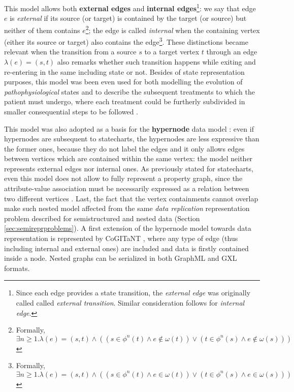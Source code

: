 This model allows both \textbf{external edges} and \textbf{internal edges}\footnote{Since each edge provides a state transition, the \textit{external edge} was originally called called \textit{external transition}. Similar consideration follows for \textit{internal edge}.}: we say that edge $e$ is \textit{external} if its source (or target) is contained by the target (or source) but neither of them contains $e$\footnote{Formally, $\exists n\geq 1.\lambda(e)=(s,t)\wedge ((s\in\phi^n(t) \wedge e\notin \omega(t))\vee (t\in \phi^n(s)\wedge e\notin \omega(s)))$}; the edge is called \textit{internal} when the containing vertex (either its source or target) also contains the edge\footnote{Formally, $\exists n\geq 1.\lambda(e)=(s,t)\wedge ((s\in\phi^n(t) \wedge e\in \omega(t))\vee (t\in \phi^n(s)\wedge e\in \omega(s)))$}. These distinctions became relevant when the transition from a source $s$ to a target vertex $t$ through an edge $\lambda(e)=(s,t)$ also remarks whether such transition happens while exiting and re-entering in the same including state or not. Besides of state representation purposes, this model was been even used for both modelling the evolution of \textit{pathophysiological} states and to describe the subsequent treatments to which the patient must undergo, where each treatment could be furtherly subdivided in smaller consequential steps to be followed \cite{NestedGlaucoma}.

This model was also adopted as a basis for the \textbf{hypernode} data model \cite{Poulovassilis1994}: even if hypernodes are subsequent to statecharts, the hypernodes are less expressive than the former ones, because they do not label the edges and it only allows edges between vertices which are contained within the same vertex: the model neither represents external edges nor internal ones. As previously stated for statecharts, even this model does not allow to fully represent a property graph, since the attribute-value association must be necessarily expressed as a relation between two different vertices \cite{Poulovassilis1994}. Last, the fact that the vertex containments cannot overlap make such nested model affected from the same \textit{data replication} representation problem described for semistructured and nested data (Section \vref{sec:semireprproblems}). A first extension of the hypernode model towards data representation is represented by CoGITaNT \cite{GenestS98}, where any type of edge (thus including internal and external ones) are included and data is firstly contained inside a node. Nested graphs can be serialized in both GraphML \cite{graphml} and GXL \cite{GXL} formats.